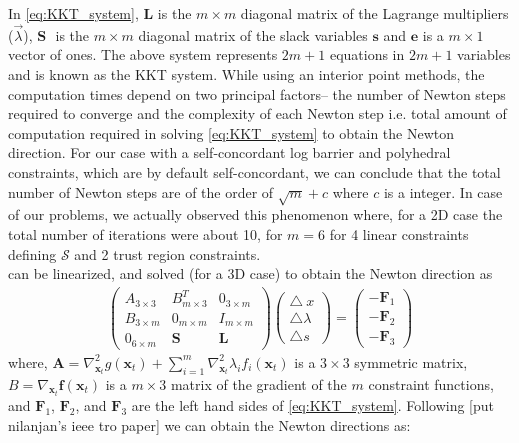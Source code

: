 \documentclass[12pt,a4]{article}
\begin{document}
In \cref{eq:KKT_system}, $\textbf{L}$ is the $m \times m$ diagonal matrix of the Lagrange multipliers ($\vec{\lambda}$), $\textbf{S }$ is the $m \times m$ diagonal matrix of the slack variables $\textbf{s}$ and $\textbf{e}$ is a $m\times 1$ vector of ones. The above system represents $2m+1$ equations in $2m+1$ variables and is known as the KKT system. While using an interior point methods, the computation times depend on two principal factors-- the number of Newton steps required to converge and the complexity of each Newton step i.e. total amount of computation required in solving \cref{eq:KKT_system} to obtain the Newton direction. For our case with  a self-concordant log barrier and polyhedral constraints, which are by default self-concordant, we can conclude that the total number of Newton steps are of the order of $\sqrt{m}+c$ where $c$ is a integer. In case of our problems, we actually observed this phenomenon where, for a 2D case the total number of iterations were about 10, for $m=6$ for 4 linear constraints defining $\mathcal{S}$ and 2 trust region constraints.\\
 can be linearized, and solved (for a 3D case) to obtain the Newton direction as
\begin{align}\label{eq:Lin_KKT}
\left(\begin{array}{ccc}
 A_{3\times3} & B^T_{m\times 3} & 0_{3\times m} \\ 
B_{3\times m}  & 0_{m\times m} & I_{m\times m} \\ 
0_{6\times m} & \textbf{S} & \textbf{L}
\end{array}  \right) \left( \begin{array}{c}
\triangle\ x \\ 
\triangle \lambda \\ 
 \triangle s
\end{array}  \right) = \left( \begin{array}{c}
-\textbf{F}_1 \\ 
-\textbf{F}_2 \\ 
-\textbf{F}_3
\end{array}  \right) 
\end{align}
where, $\textbf{A}=\nabla_{\textbf{x}_t}^2g(\textbf{x}_t)+\sum\limits_{i=1}^{m}\nabla_{\textbf{x}_t}^2\lambda_if_i(\textbf{x}_t)$ is a $3\times3$ symmetric matrix, $B=\nabla_{\textbf{x}_t}\textbf{f}(\textbf{x}_t)$ is a $m\times3$ matrix of the gradient of the $m$ constraint functions, and $\textbf{F}_1$, $\textbf{F}_2$, and $\textbf{F}_3$ are the left hand sides of \cref{eq:KKT_system}. Following [put nilanjan's ieee tro paper] we can obtain the Newton directions as:
\end{document}
